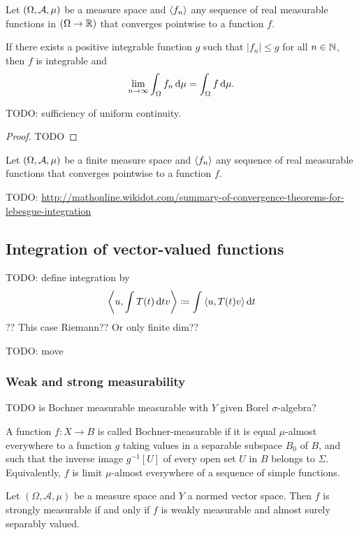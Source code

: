 \begin{theorem}
Let $\left( \Omega, \mathcal{A}, \mu \right)$ be a measure space and $\left\langle f_n \right\rangle$ any sequence of real measurable functions in $(\Omega\to\mathbb{R})$ that converges pointwise to a function $f$.

If there exists a positive integrable function $g$ such that $|f_n| \leq g$ for all $n\in \mathbb{N}$, then $f$ is integrable and
\[ \lim_{n\to \infty}\int_\Omega f_n \operatorname{d \!}{\mu} = \int_\Omega f\operatorname{d \!}{\mu}. \]
\end{theorem}
TODO: sufficiency of uniform continuity.
\begin{proof}
TODO
\end{proof}
\begin{corollary} \label{boundedConvergenceTheorem}
Let $\left( \Omega, \mathcal{A}, \mu \right)$ be a finite measure space and $\left\langle f_n \right\rangle$ any sequence of real measurable functions that converges pointwise to a function $f$.
\end{corollary}
TODO: \url{http://mathonline.wikidot.com/summary-of-convergence-theorems-for-lebesgue-integration}


\subsection{Integration of vector-valued functions}
TODO: define integration by
\[ \left\langle u, \int T(t)\operatorname{d \!}{t} v \right\rangle \coloneqq \int\left\langle u,T(t)v \right\rangle\operatorname{d \!}{t} \]
??
This case Riemann?? Or only finite dim??

TODO: move

\subsubsection{Weak and strong measurability}
TODO is Bochner measurable measurable with $Y$ given Borel $\sigma$-algebra?

A function $f:X\to B$ is called Bochner-measurable if it is equal $\mu$-almost everywhere to a function $g$ taking values in a separable subspace $B_{0}$ of $B$, and such that the inverse image $g^{-1}[U]$ of every open set $U$ in $B$ belongs to $\Sigma$. Equivalently, $f$ is limit $\mu$-almost everywhere of a sequence of simple functions. 

\begin{theorem}
Let $(\Omega, \mathcal{A},\mu)$ be a measure space and $Y$ a normed vector space. Then $f$ is strongly measurable \textup{if and only if} $f$ is weakly measurable and almost surely separably valued.
\end{theorem}



